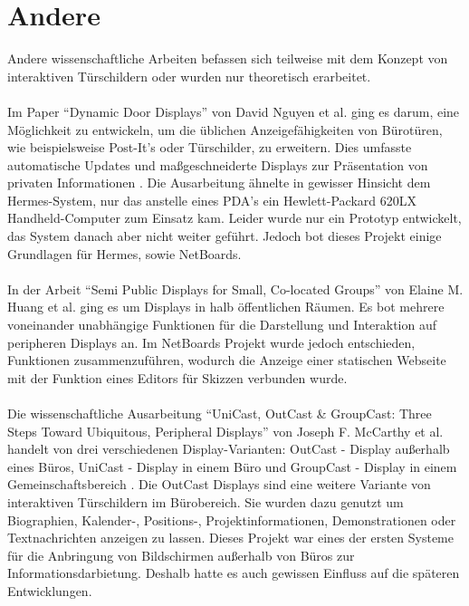 \section{Andere}
Andere wissenschaftliche Arbeiten befassen sich teilweise mit dem Konzept von interaktiven Türschildern oder wurden nur theoretisch erarbeitet.
\\\\
Im Paper ``Dynamic Door Displays'' von David Nguyen et al. ging es darum, eine Möglichkeit zu entwickeln, um die üblichen Anzeigefähigkeiten von Bürotüren, wie beispielsweise Post-It's oder Türschilder, zu erweitern. Dies umfasste automatische Updates und maßgeschneiderte Displays zur Präsentation von privaten Informationen \cite{nguyen:dyn-door-disp}. Die Ausarbeitung ähnelte in gewisser Hinsicht dem Hermes-System, nur das anstelle eines PDA's ein Hewlett-Packard 620LX Handheld-Computer zum Einsatz kam.
Leider wurde nur ein Prototyp entwickelt, das System danach aber nicht weiter geführt. Jedoch bot dieses Projekt einige Grundlagen für Hermes, sowie NetBoards.
\\\\
In der Arbeit ``Semi Public Displays for Small, Co-located Groups'' von Elaine M. Huang et al. ging es um Displays in halb öffentlichen Räumen.  Es bot mehrere voneinander unabhängige Funktionen für die Darstellung und Interaktion auf peripheren Displays an. Im NetBoards Projekt wurde jedoch entschieden, Funktionen zusammenzuführen, wodurch \bspw die Anzeige einer statischen Webseite mit der Funktion eines Editors für Skizzen verbunden wurde.
\\\\
Die wissenschaftliche Ausarbeitung ``UniCast, OutCast \& GroupCast: Three Steps Toward Ubiquitous, Peripheral Displays'' von Joseph F. McCarthy et al. handelt von drei verschiedenen Display-Varianten: OutCast - Display außerhalb eines Büros, UniCast - Display in einem Büro und GroupCast - Display in einem Gemeinschaftsbereich \cite{mccarthy:2001}. Die OutCast Displays sind eine weitere Variante von interaktiven Türschildern im Bürobereich. Sie wurden dazu genutzt um Biographien, Kalender-, Positions-, Projektinformationen, Demonstrationen oder Textnachrichten anzeigen zu lassen. Dieses Projekt war eines der ersten Systeme für die Anbringung von Bildschirmen außerhalb von Büros zur Informationsdarbietung. Deshalb hatte es auch gewissen Einfluss auf die späteren Entwicklungen.
